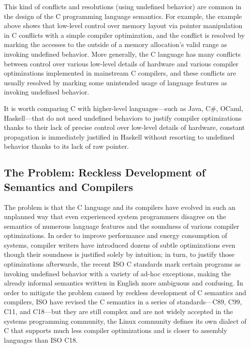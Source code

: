 
This kind of conflicts and resolutions (using undefined behavior) are common in the design of the C
programming language semantics.  For example, the example above shows that low-level control over
memory layout via pointer manipulation in C conflicts with a simple compiler optimization, and the
conflict is resolved by marking the accesses to the outside of a memory allocation's valid range as
invoking undefined behavior.  More generally, the C language has many conflicts between control over
various low-level details of hardware and various compiler optimizations implemented in mainstream C
compilers, and these conflicts are usually resolved by marking some unintended usage of language
features as invoking undefined behavior.

It is worth comparing C with higher-level languages---such as Java, C\#, OCaml, Haskell---that do
not need undefined behaviors to justify compiler optimizations thanks to their lack of precise
control over low-level details of hardware, \eg{} constant propagation is immediately justified in
Haskell without resorting to undefined behavior thanks to its lack of raw pointer.




\subsection{The Problem: Reckless Development of Semantics and Compilers}

The problem is that the C language and its compilers have evolved in such an unplanned way that even
experienced system programmers disagree on the semantics of numerous language features and the
soundness of various compiler optimizations.  In order to improve performance and energy consumption
of systems, compiler writers have introduced dozens of subtle optimizations even though their
soundness is justified solely by intuition; in turn, to justify those optimizations afterwards, the
recent ISO C standards mark certain programs as invoking undefined behavior with a variety of ad-hoc
exceptions, making the already informal semantics written in English more ambiguous and confusing.
In order to mitigate the problem caused by reckless development of C semantics and compilers, ISO
have revised the C semantics in a series of standards---C89, C99, C11, and C18---but they are still
complex and are not widely accepted in the systems programming community, \eg{} the Linux community
defines its own dialect of C that supports much less compiler optimizations and is closer to
assembly languages than ISO C18.

